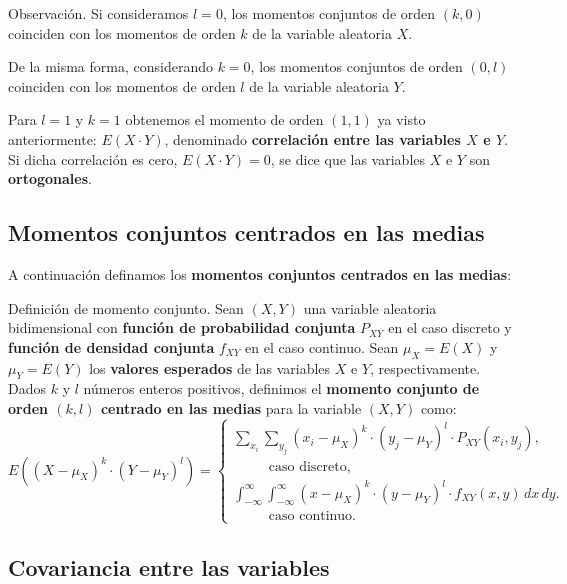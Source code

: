 \documentclass[]{book}
\begin{document}
Observación.
Si consideramos \(l=0\), los momentos conjuntos de orden \((k,0)\) coinciden con los momentos de orden \(k\) de la variable aleatoria \(X\).

De la misma forma, considerando \(k=0\), los momentos conjuntos de orden \((0,l)\) coinciden con los momentos de orden \(l\) de la variable aleatoria \(Y\).

Para \(l=1\) y \(k=1\) obtenemos el momento de orden \((1,1)\) ya visto anteriormente: \(E(X\cdot Y)\), denominado \textbf{correlación entre las variables \(X\) e \(Y\)}. Si dicha correlación es cero, \(E(X\cdot Y)=0\), se dice que las variables \(X\) e \(Y\) son \textbf{ortogonales}.

\hypertarget{momentos-conjuntos-centrados-en-las-medias}{%
\subsection{Momentos conjuntos centrados en las medias}\label{momentos-conjuntos-centrados-en-las-medias}}

A continuación definamos los \textbf{momentos conjuntos centrados en las medias}:

Definición de momento conjunto.
Sean \((X,Y)\) una variable aleatoria bidimensional con \textbf{función de probabilidad conjunta} \(P_{XY}\) en el caso discreto y \textbf{función de densidad conjunta} \(f_{XY}\) en el caso continuo. Sean \(\mu_X=E(X)\) y \(\mu_Y=E(Y)\) los \textbf{valores esperados} de las variables \(X\) e \(Y\), respectivamente. Dados \(k\) y \(l\) números enteros positivos, definimos el \textbf{momento conjunto de orden \((k,l)\) centrado en las medias} para la variable \((X,Y)\) como:
\[
E\left((X-\mu_X)^k\cdot  (Y-\mu_Y)^l\right)=\begin{cases}
\sum_{x_i}\sum_{y_j} (x_i-\mu_X)^k \cdot (y_j-\mu_Y)^l\cdot  P_{XY}(x_i,y_j), & \\\ \qquad \mbox{ caso discreto,}& \\
\int_{-\infty}^\infty\int_{-\infty}^\infty (x-\mu_X)^k\cdot  (y-\mu_Y)^l\cdot  f_{XY}(x,y)\, dx\, dy. & \\ \ \qquad\mbox{ caso continuo.} &
\end{cases}
\]

\hypertarget{covariancia-entre-las-variables}{%
\subsection{Covariancia entre las variables}\label{covariancia-entre-las-variables}}
\end{document}
